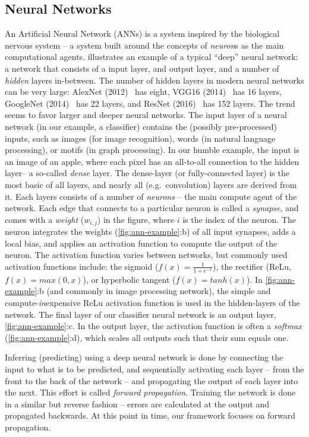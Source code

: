 \documentclass[techrep,english]{ipsj} %
\begin{document}
\subsection{Neural Networks}
An Artificial Neural Network (ANNs) is a system inspired by the biological nervous system -- a system built around the concepts of \textit{neuron}s as the main computational agents.
 illustrates an example of a typical “deep” neural network: a network that consists of a input layer, and output layer, and a number of \textit{hidden} layers in-between.
The number of hidden layers in modern neural networks can be very large: AlexNet (2012)~\cite{krizhevsky2012imagenet} has eight, VGG16 (2014)~\cite{simonyan2014very} has 16 layers, GoogleNet (2014)~\cite{szegedy2015going} has 22 layers, and ResNet (2016)~\cite{he2016deep} has 152 layers.
The trend seems to favor larger and deeper neural networks.
The input layer of a neural network (in our example, a classifier) contains the (possibly pre-processed) inputs, such as images (for image recognition), words (in natural language processing), or motifs (in graph processing).
In our humble example, the input is an image of an apple, where each pixel has an all-to-all connection to the hidden layer-- a so-called \textit{dense} layer. The dense-layer (or fully-connected layer) is the most basic of all layers, and nearly all (e.g.\ convolution) layers are derived from it.
Each layers consists of a number of \textit{neurons} – the main compute agent of the network.
Each edge that connects to a particular neuron is called a \textit{synapse}, and comes with a \textit{weight} (\(w_{i,j}\)) in the figure, where \(i\) is the index of the neuron.
The neuron integrates the weights (\cref{fig:ann-example}:b) of all input synapses, adds a local bias, and applies an activation function to compute the output of the neuron. The activation function varies between networks, but commonly used activation functions include: the sigmoid (\(f(x) = \frac{1}{1+e^{-x}}\)), the rectifier (ReLu, \(f(x) = max(0,x)\)), or hyperbolic tangent (\(f(x) = tanh(x)\)).
In \cref{fig:ann-example}:b (and commonly in image processing network), the simple and compute-\textit{in}expensive ReLu activation function is used in the hidden-layers of the network. The final layer of our classifier neural network is an output layer, \cref{fig:ann-example}:c. In the output layer, the activation function is often a \textit{softmax} (\cref{fig:ann-example}:d), which scales all outputs such that their sum equals one.

Inferring (predicting) using a deep neural network is done by connecting the input to what is to be predicted, and sequentially activating each layer -- from the front to the back of the network -- and propagating the output of each layer into the next.
This effort is called \textit{forward propagation}. Training the network is done in a similar but reverse fashion -- errors are calculated at the output and propagated backwards.
At this point in time, our framework focuses on forward propagation.
\end{document}
